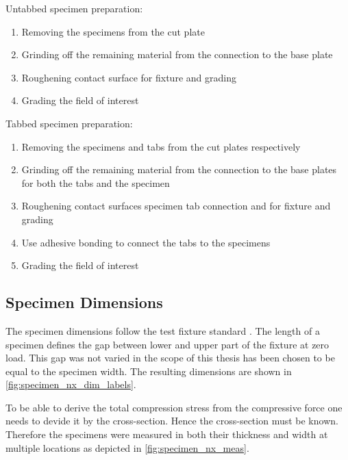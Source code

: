 \begin{minipage}[t]{\dimexpr(\distTextWidth-\distColSep)/2\relax}
    Untabbed specimen preparation:
    \begin{enumerate}
        \item Removing the specimens from the cut plate 
        \item Grinding off the remaining material from the connection to the base plate
        \item Roughening contact surface for fixture and grading
        \item Grading the field of interest
    \end{enumerate}
\end{minipage}%
\hfill%
\noindent
\begin{minipage}[t]{\dimexpr(\distTextWidth-\distColSep)/2\relax}
    Tabbed specimen preparation:
    \begin{enumerate}
        \item Removing the specimens and tabs from the cut plates respectively
        \item Grinding off the remaining material from the connection to the base plates for both the tabs and the specimen
        \item Roughening contact surfaces specimen tab connection and for fixture and grading
        \item Use adhesive bonding to connect the tabs to the specimens
        \item Grading the field of interest
    \end{enumerate}
\end{minipage}

\subsection{Specimen Dimensions}
\label{subsec:spec_dim}

The specimen dimensions follow the test fixture standard \cite{D6641standard}. The length of a specimen defines the gap between lower and upper part of the fixture at zero load. This gap was not varied in the scope of this thesis has been chosen to be equal to the specimen width. The resulting dimensions are shown in \autoref{fig:specimen_nx_dim_labels}.

To be able to derive the total compression stress from the compressive force one needs to devide it by the cross-section. Hence the cross-section must be known. Therefore the specimens were measured in both their thickness and width at multiple locations as depicted in \autoref{fig:specimen_nx_meas}.

